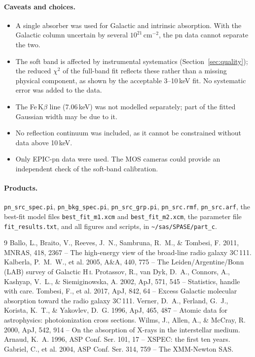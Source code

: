 \documentclass[11pt,a4paper]{article}
\begin{document}
\paragraph{Caveats and choices.}
\begin{itemize}
\item A single absorber was used for Galactic and intrinsic absorption. With the Galactic column uncertain by several $10^{21}$\,cm$^{-2}$, the pn data cannot separate the two.
\item The soft band is affected by instrumental systematics (Section~\ref{sec:quality}); the reduced $\chi^2$ of the full-band fit reflects these rather than a missing physical component, as shown by the acceptable 3--10\,keV fit. No systematic error was added to the data.
\item The Fe\,K$\beta$ line (7.06\,keV) was not modelled separately; part of the fitted Gaussian width may be due to it.
\item No reflection continuum was included, as it cannot be constrained without data above 10\,keV.
\item Only EPIC-pn data were used. The MOS cameras could provide an independent check of the soft-band calibration.
\end{itemize}

\paragraph{Products.} \texttt{pn\_src\_spec.pi}, \texttt{pn\_bkg\_spec.pi}, \texttt{pn\_src\_grp.pi}, \texttt{pn\_src.rmf}, \texttt{pn\_src.arf}, the best-fit model files \texttt{best\_fit\_m1.xcm} and \texttt{best\_fit\_m2.xcm}, the parameter file \texttt{fit\_results.txt}, and all figures and scripts, in \texttt{\textasciitilde/sas/SPASE/part\_c}.

\begin{thebibliography}{9}
 Ballo, L., Braito, V., Reeves, J.~N., Sambruna, R.~M., \& Tombesi, F. 2011, MNRAS, 418, 2367 -- The high-energy view of the broad-line radio galaxy 3C\,111.
 Kalberla, P.~M.~W., et al. 2005, A\&A, 440, 775 -- The Leiden/Argentine/Bonn (LAB) survey of Galactic H\,\textsc{i}.
 Protassov, R., van Dyk, D.~A., Connors, A., Kashyap, V.~L., \& Siemiginowska, A. 2002, ApJ, 571, 545 -- Statistics, handle with care.
 Tombesi, F., et al. 2017, ApJ, 842, 64 -- Excess Galactic molecular absorption toward the radio galaxy 3C\,111.
 Verner, D.~A., Ferland, G.~J., Korista, K.~T., \& Yakovlev, D.~G. 1996, ApJ, 465, 487 -- Atomic data for astrophysics: photoionization cross sections.
 Wilms, J., Allen, A., \& McCray, R. 2000, ApJ, 542, 914 -- On the absorption of X-rays in the interstellar medium.
 Arnaud, K.~A. 1996, ASP Conf. Ser. 101, 17 -- XSPEC: the first ten years.
 Gabriel, C., et al. 2004, ASP Conf. Ser. 314, 759 -- The XMM-Newton SAS.
\end{thebibliography}
\end{document}
